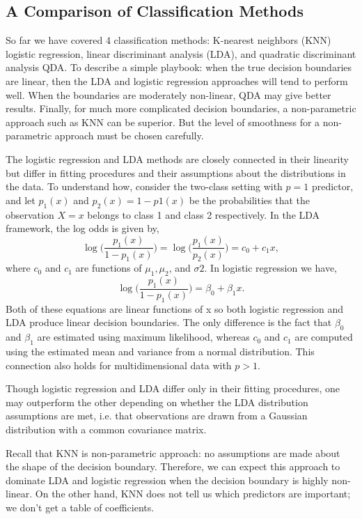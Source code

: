\documentclass{article}
\numberwithin{equation}{section}
\begin{document}
\begin{enumerate}
\subsection{A Comparison of Classification Methods}
So far we have covered 4 classification methods:  K-nearest neighbors (KNN) logistic regression, linear discriminant analysis (LDA), and quadratic discriminant analysis QDA. To describe a simple playbook: when the true decision boundaries are linear, then the LDA and logistic regression approaches will tend to perform well. When the boundaries are moderately non-linear, QDA may give better results. Finally, for much more complicated decision boundaries, a non-parametric approach such as KNN can be superior. But the level of smoothness for a non-parametric approach must be chosen carefully.

The logistic regression and LDA methods are closely connected in their linearity but differ in fitting procedures and their assumptions about the distributions in the data. To understand how, consider the two-class setting with $p = 1$ predictor, and let $p_1(x)$ and $p_2(x)=1-p1(x)$ be the probabilities that the observation $X = x$ belongs to class 1 and class 2 respectively. In the LDA framework, the log odds is given by,
\begin{equation}
    \log \Bigg( \frac{p_1(x)}{1 -p_1(x)}\Bigg) = \log \Bigg( \frac{p_1(x)}{p_2(x)}\Bigg) = c_0 + c_1 x,
\end{equation}
where $c_0$ and $c_1$ are functions of $\mu_1, \mu_2$, and $\sigma2$. In logistic regression we have,
\begin{equation}
    \log \Bigg( \frac{p_1(x)}{1 -p_1(x)}\Bigg) = \beta_0 + \beta_1 x.
\end{equation}
Both of these equations are linear functions of x so both logistic regression and LDA produce linear decision boundaries. The only difference is the fact that $\beta_0$ and $\beta_1$ are estimated using maximum likelihood, whereas $c_0$ and $c_1$ are computed using the estimated mean and variance from a normal distribution. This connection also holds for multidimensional data with $p > 1$.

Though logistic regression and LDA differ only in their fitting procedures, one may outperform the other depending on whether the LDA distribution assumptions are met, i.e. that observations are drawn from a Gaussian distribution with a common covariance matrix.

Recall that KNN is non-parametric approach: no assumptions are made about the shape of the decision boundary. Therefore, we can expect this approach to dominate LDA and logistic regression when the decision boundary is highly non-linear.  On the other hand, KNN does not tell us which predictors are important; we don’t get a table of coefficients.


\end{enumerate}
\end{document}
